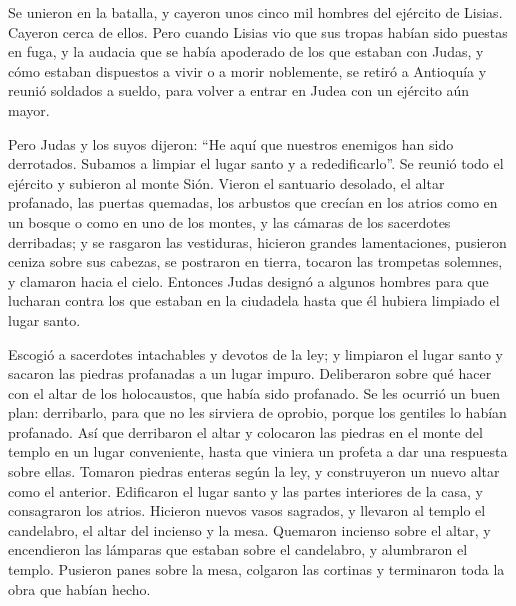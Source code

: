  Se unieron en la batalla, y cayeron unos cinco mil
hombres del ejército de Lisias. Cayeron cerca de ellos. 
Pero cuando Lisias vio que sus tropas habían sido puestas en fuga, y la
audacia que se había apoderado de los que estaban con Judas, y cómo
estaban dispuestos a vivir o a morir noblemente, se retiró a Antioquía y
reunió soldados a sueldo, para volver a entrar en Judea con un ejército
aún mayor.

 Pero Judas y los suyos dijeron: ``He aquí que nuestros
enemigos han sido derrotados. Subamos a limpiar el lugar santo y a
rededificarlo''.  Se reunió todo el ejército y subieron
al monte Sión.  Vieron el santuario desolado, el altar
profanado, las puertas quemadas, los arbustos que crecían en los atrios
como en un bosque o como en uno de los montes, y las cámaras de los
sacerdotes derribadas;  y se rasgaron las vestiduras,
hicieron grandes lamentaciones, pusieron ceniza sobre sus cabezas,
 se postraron en tierra, tocaron las trompetas solemnes,
y clamaron hacia el cielo.  Entonces Judas designó a
algunos hombres para que lucharan contra los que estaban en la ciudadela
hasta que él hubiera limpiado el lugar santo.

 Escogió a sacerdotes intachables y devotos de la ley;
 y limpiaron el lugar santo y sacaron las piedras
profanadas a un lugar impuro.  Deliberaron sobre qué
hacer con el altar de los holocaustos, que había sido profanado.
 Se les ocurrió un buen plan: derribarlo, para que no les
sirviera de oprobio, porque los gentiles lo habían profanado. Así que
derribaron el altar  y colocaron las piedras en el monte
del templo en un lugar conveniente, hasta que viniera un profeta a dar
una respuesta sobre ellas.  Tomaron piedras enteras según
la ley, y construyeron un nuevo altar como el anterior. 
Edificaron el lugar santo y las partes interiores de la casa, y
consagraron los atrios.  Hicieron nuevos vasos sagrados,
y llevaron al templo el candelabro, el altar del incienso y la mesa.
 Quemaron incienso sobre el altar, y encendieron las
lámparas que estaban sobre el candelabro, y alumbraron el templo.
 Pusieron panes sobre la mesa, colgaron las cortinas y
terminaron toda la obra que habían hecho.

